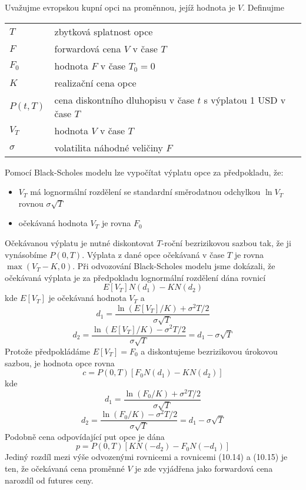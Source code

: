\documentclass[a4paper]{book}
\begin{document}
Uvažujme evropskou kupní opci na proměnnou, jejíž hodnota je $V$. Definujme
\begin{center}
\begin{tabular}{l l}
$T$ & zbytková splatnost opce\\
$F$ & forwardová cena $V$ v čase $T$\\
$F_0$ & hodnota $F$ v čase $T_0 = 0$\\
$K$ & realizační cena opce\\
$P(t,T)$ & cena diskontního dluhopisu v čase $t$ s výplatou 1 USD v čase $T$\\
$V_T$ & hodnota $V$ v čase $T$\\
$\sigma$ & volatilita náhodné veličiny $F$\\
\end{tabular}
\end{center}
Pomocí Black-Scholes modelu lze vypočítat výplatu opce za předpokladu, že:
\begin{itemize}
\item $V_T$ má lognormální rozdělení se standardní směrodatnou odchylkou $\ln V_T$ rovnou $\sigma \sqrt{T}$
\item očekávaná hodnota $V_T$ je rovna $F_0$
\end{itemize}
Očekávanou výplatu je nutné diskontovat $T$-roční bezrizikovou sazbou tak, že ji vynásobíme $P(0,T)$. Výplata z dané opce očekávaná v čase $T$ je rovna $\max(V_T - K, 0)$. Při odvozování Black-Scholes modelu jsme dokázali, že očekávaná výplata je za předpokladu lognormální rozdělení dána rovnicí
\begin{equation*}
E[V_T]N(d_1) - KN(d_2)
\end{equation*}
kde $E[V_T]$ je očekávaná hodnota $V_T$ a
\begin{equation*}
d_1 = \frac{\ln(E[V_T]/K) + \sigma^2T/2}{\sigma \sqrt{T}}
\end{equation*}
\begin{equation*}
d_2 = \frac{\ln(E[V_T]/K)-\sigma^2T/2}{\sigma \sqrt{T}}= d_1 - \sigma \sqrt{T}
\end{equation*}
Protože předpokládáme $E[V_T] = F_0$ a diskontujeme bezrizikovou úrokovou sazbou, je hodnota opce rovna
\begin{equation}
c = P(0,T)[F_0N(d_1)-KN(d_2)]
\end{equation}
kde
\begin{equation*}
d_1 = \frac{\ln(F_0/K)+\sigma^2T/2}{\sigma \sqrt{T}}
\end{equation*}
\begin{equation*}
d_2 = \frac{\ln(F_0/K)-\sigma^2T/2}{\sigma \sqrt{T}} = d_1 - \sigma \sqrt{T}
\end{equation*}
Podobně cena odpovídající put opce je dána
\begin{equation}
p = P(0,T)[KN(-d_2)-F_0N(-d_1)]
\end{equation}
Jediný rozdíl mezi výše odvozenými rovnicemi a rovnicemi (10.14) a (10.15) je ten, že očekávaná cena proměnné $V$ je zde vyjádřena jako forwardová cena narozdíl od futures ceny.
\end{document}
